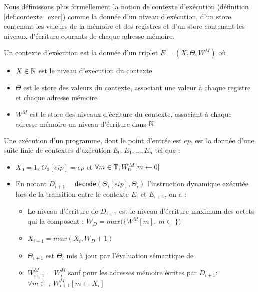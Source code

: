 
Nous définissons plus formellement la notion de contexte d'exécution (définition \ref{def:contexte_exec}) comme la donnée d'un niveau d'exécution, d'un store contenant les valeurs de la mémoire et des registres et d'un store contenant les niveaux d'écriture courants de chaque adresse mémoire.

\begin{defi}
Un contexte d'exécution est la donnée d'un triplet $E=(X, \Theta, W^M)$ où
\begin{itemize}
 \item $X\in\mathbb N$ est le niveau d'exécution du contexte
 \item $\Theta$ est le store des valeurs du contexte, associant une valeur à chaque registre et chaque adresse mémoire
 \item $W^M$ est le store des niveaux d'écriture du contexte, associant à chaque adresse mémoire un niveau d'écriture dans $\mathbb N$
\end{itemize}
Une exécution d'un programme, dont le point d'entrée est $ep$, est la donnée d'une suite finie de contextes d'exécution $E_0, E_1, ..., E_n$ tel que :
\begin{itemize}
 \item $X_0=1$, $\Theta_0[eip]=ep$ et $\forall m\in \mathbb T, W_0^M[m\leftarrow 0]$
 \item En notant $D_{i+1}=$\texttt{decode}$(\Theta_i[eip], \Theta_i)$ l'instruction dynamique exécutée lors de la transition entre le contexte $E_i$ et $E_{i+1}$, on a :
    \begin{itemize}
     \item Le niveau d'écriture de $D_{i+1}$ est le niveau d'écriture maximum des octets qui la composent : $W_D=max(\{W^M[m],\ m\in\ $$\})$
     \item $X_{i+1}=max(X_i, W_D+1)$
     \item $\Theta_{i+1}$ est $\Theta_i$ mis à jour par l'évaluation sémantique de 
     \item $W_{i+1}^M=W_{i}^M$ sauf pour les adresses mémoire écrites par $D_{i+1}$:\\ $\forall m\in\ $$,\ W_{i+1}^M[m\leftarrow X_i]$
    \end{itemize}
\end{itemize}
\label{def:contexte_exec}
\end{defi}

